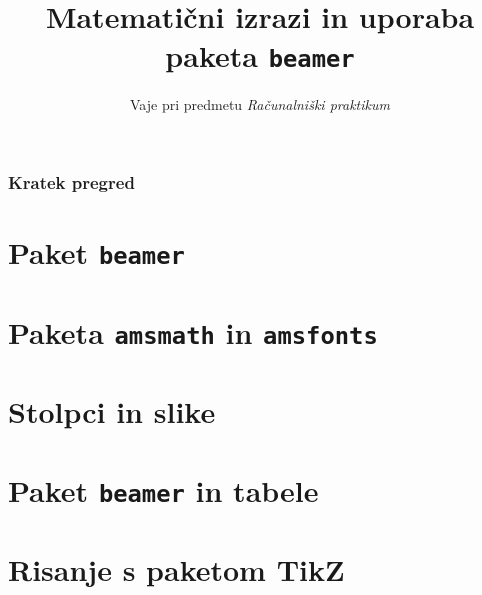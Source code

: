 \documentclass{beamer}
\begin{document}
\title{Matematični izrazi in uporaba paketa \texttt{beamer}}
\subtitle{Vaje pri predmetu \emph{Računalniški praktikum}}
\date{}
\frame{\titlepage}
\begin{frame}
    \frametitle{Kratek pregred}
    \tableofcontents%
\end{frame}

\section{Paket \texttt{beamer}}
    

\section{Paketa \texttt{amsmath} in \texttt{amsfonts}}
    

\section{Stolpci in slike}
    
    

\section{Paket \texttt{beamer} in tabele}
    

\section{Risanje s paketom TikZ}    
    
\end{document}
